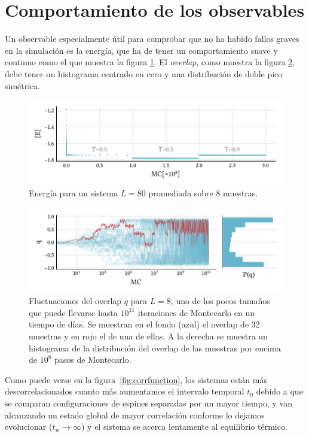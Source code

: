 \documentclass[11pt]{report}
\begin{document}
\section{Comportamiento de los observables}

Un observable especialmente útil para comprobar que no ha habido
fallos graves en la simulación es la energía, que ha de tener un
comportamiento suave y continuo como el que muestra la figura
\ref{fig:energyprotocol}. El \textit{overlap}, como muestra la figura
\ref{fig:overlap}, debe tener un histograma centrado en cero y una
distribución de doble pico simétrica.

\begin{figure}
  \centering
  \includegraphics{../study_cases/energy_in_protocol/energyprotocol.pdf}
  \caption{Energía para un sistema $L=80$ promediada sobre 8 muestras.}
  \label{fig:energyprotocol}
\end{figure}

\begin{figure}
  \centering
  \includegraphics{../study_cases/overlap/overlap.pdf}
  \caption{Fluctuaciones del overlap $q$ para $L=8$, uno de los pocos
    tamaños que puede llevarse hasta $10^{11}$ iteraciones de
    Montecarlo en un tiempo de días. Se muestran en el fondo (azul) el
    overlap de 32 muestras y en rojo el de una de ellas. A la derecha
    se muestra un histograma de la distribución del overlap de las
    muestras por encima de $10^8$ pasos de Montecarlo.}
  \label{fig:overlap}
\end{figure}

Como puede verse en la figura~\ref{fig:corrfunction}, los sistemas
están más descorrelacionados cuanto más aumentamos el intervalo
temporal $t_0$ debido a que se comparan configuraciones de espines
separadas por un mayor tiempo, y van alcanzando un estado global de
mayor correlación conforme lo dejamos evolucionar ($t_w → ∞$) y el
sistema se acerca lentamente al equilibrio térmico.
\end{document}
